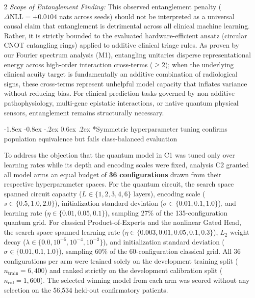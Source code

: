 \documentclass[10pt,a4paper,twoside]{article}
\makeatletter
\renewcommand{\subsection}{\@startsection{subsection}{2}{\z@}%
  {-1.8ex \@plus -0.8ex \@minus -.2ex}%
  {0.6ex \@plus.2ex}%
  {\normalfont\normalsize\sffamily\bfseries\color{naturedark}}}
\makeatother
\begin{document}
\begin{multicols}{2}
\noindent\textit{Scope of Entanglement Finding:} This observed entanglement penalty ($\Delta\text{NLL} = +0.0104$ nats across seeds) should not be interpreted as a universal causal claim that entanglement is detrimental across all clinical machine learning. Rather, it is strictly bounded to the evaluated hardware-efficient ansatz (circular CNOT entangling rings) applied to additive clinical triage rules. As proven by our Fourier spectrum analysis (M1), entangling unitaries disperse representational energy across high-order interaction cross-terms ($\ge 2$); when the underlying clinical acuity target is fundamentally an additive combination of radiological signs, these cross-terms represent unhelpful model capacity that inflates variance without reducing bias. For clinical prediction tasks governed by non-additive pathophysiology, multi-gene epistatic interactions, or native quantum physical sensors, entanglement remains structurally necessary.

\subsection*{Symmetric hyperparameter tuning confirms population equivalence but fails class-balanced evaluation}

To address the objection that the quantum model in C1 was tuned only over learning rates while its depth and encoding scales were fixed, analysis C2 granted all model arms an equal budget of \textbf{36 configurations} drawn from their respective hyperparameter spaces. For the quantum circuit, the search space spanned circuit capacity ($L \in \{1, 2, 3, 4, 6\}$ layers), encoding scale ($s \in \{0.5, 1.0, 2.0\}$), initialization standard deviation ($\sigma \in \{0.01, 0.1, 1.0\}$), and learning rate ($\eta \in \{0.01, 0.05, 0.1\}$), sampling 27\% of the 135-configuration quantum grid. For classical Product-of-Experts and the nonlinear Gated Head, the search space spanned learning rate ($\eta \in \{0.003, 0.01, 0.05, 0.1, 0.3\}$), $L_2$ weight decay ($\lambda \in \{0.0, 10^{-5}, 10^{-4}, 10^{-3}\}$), and initialization standard deviation ($\sigma \in \{0.01, 0.1, 1.0\}$), sampling 60\% of the 60-configuration classical grid. All 36 configurations per arm were trained solely on the development training split ($n_{\text{train}}=6,400$) and ranked strictly on the development calibration split ($n_{\text{cal}}=1,600$). The selected winning model from each arm was scored without any selection on the 56,534 held-out confirmatory patients.


\end{multicols}
\end{document}
